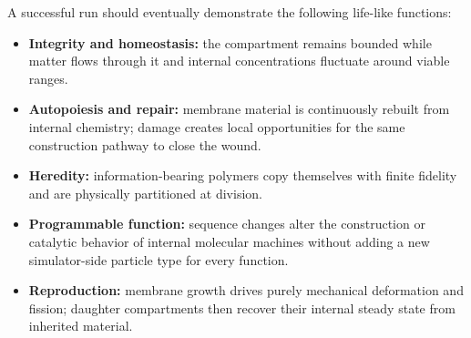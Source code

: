 \documentclass[10pt,a4paper]{article}
\newcommand{\life}[1]{\textbf{\color{accent}#1}}
\begin{document}
\begin{center}
\end{center}

A successful run should eventually demonstrate the following life-like functions:

\begin{itemize}
\item \life{Integrity and homeostasis:} the compartment remains bounded while matter flows through it and internal concentrations fluctuate around viable ranges.
\item \life{Autopoiesis and repair:} membrane material is continuously rebuilt from internal chemistry; damage creates local opportunities for the same construction pathway to close the wound.
\item \life{Heredity:} information-bearing polymers copy themselves with finite fidelity and are physically partitioned at division.
\item \life{Programmable function:} sequence changes alter the construction or catalytic behavior of internal molecular machines without adding a new simulator-side particle type for every function.
\item \life{Reproduction:} membrane growth drives purely mechanical deformation and fission; daughter compartments then recover their internal steady state from inherited material.
\end{itemize}
\end{document}
